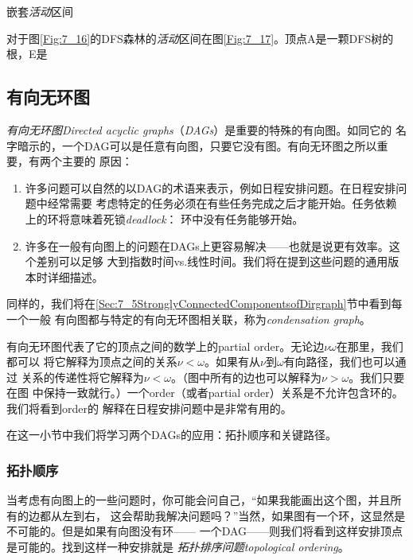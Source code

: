 \begin{figure*}[!t]
    \centering
    \caption{图\ref{Fig:7_16}中DFS森林的\emph{活动}区间}
    \label{Fig:7_17}
\end{figure*}

\begin{definition}
嵌套\emph{活动}区间

对于图\ref{Fig:7_16}的DFS森林的\emph{活动}区间在图\ref{Fig:7_17}。顶点A是一颗DFS树的
根，E是
\end{definition}


\subsection{有向无环图}
\emph{有向无环图Directed acyclic graphs}（\emph{DAGs}）是重要的特殊的有向图。如同它的
名字暗示的，一个DAG可以是任意有向图，只要它没有图。有向无环图之所以重要，有两个主要的
原因：
\begin{enumerate}
\item 许多问题可以自然的以DAG的术语来表示，例如日程安排问题。在日程安排问题中经常需要
考虑特定的任务必须在有些任务完成之后才能开始。任务依赖上的环将意味着死锁\emph{deadlock}：
环中没有任务能够开始。
\item 许多在一般有向图上的问题在DAGs上更容易解决——也就是说更有效率。这个差别可以足够
大到指数时间vs.线性时间。我们将在提到这些问题的通用版本时详细描述。
\end{enumerate}

同样的，我们将在\ref{Sec:7_5StronglyConnectedComponentsofDirgraph}节中看到每一个一般
有向图都与特定的有向无环图相关联，称为\emph{condensation graph}。

有向无环图代表了它的顶点之间的数学上的partial order。无论边$\nu\omega$在那里，我们都可以
将它解释为顶点之间的关系$\nu<\omega$。如果有从$\nu$到$\omega$有向路径，我们也可以通过
关系的传递性将它解释为$\nu<\omega$。（图中所有的边也可以解释为$\nu>\omega$。我们只要在图
中保持一致就行。）一个order（或者partial order）关系是不允许包含环的。我们将看到order的
解释在日程安排问题中是非常有用的。

在这一小节中我们将学习两个DAGs的应用：拓扑顺序和关键路径。

\subsubsection{拓扑顺序}
当考虑有向图上的一些问题时，你可能会问自己，“如果我能画出这个图，并且所有的边都从左到右，
这会帮助我解决问题吗？”当然，如果图有一个环，这显然是不可能的。但是如果有向图没有环——
一个DAG——则我们将看到这样安排顶点是可能的。找到这样一种安排就是
\emph{拓扑排序问题topological ordering}。

